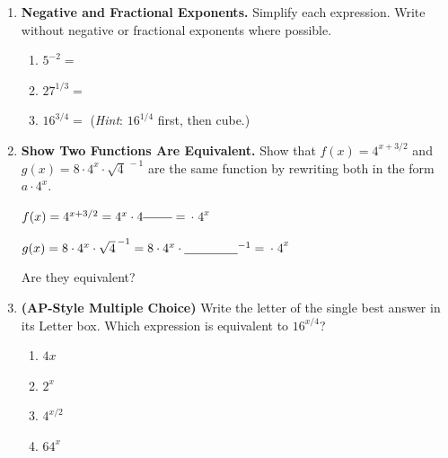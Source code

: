 \documentclass[10pt]{article}
\begin{document}
\begin{enumerate}[itemsep=18pt]
\item \textbf{Negative and Fractional Exponents.}
      Simplify each expression. Write without negative or fractional exponents where possible.

      \begin{enumerate}[label=(\alph*), itemsep=8pt]
        \item $5^{-2} = $ \smash{\gradedblank[id=hw3a, type=short, points=1, answer={\frac{1}{25}}, display={$1/25$}]{3cm}{13pt}}
        \item $27^{1/3} = $ \smash{\gradedblank[id=hw3b, type=short, points=1, answer={3}]{3cm}{13pt}}
        \item $16^{3/4} = $ \smash{\gradedblank[id=hw3c, type=short, points=1, answer={8}]{3cm}{13pt}} \quad (\textit{Hint}: $16^{1/4}$ first, then cube.)
      \end{enumerate}

\item \textbf{Show Two Functions Are Equivalent.}
      Show that $f(x) = 4^{x+3/2}$ and $g(x) = 8 \cdot 4^x \cdot \sqrt{4}^{\,-1}$ are the same
      function by rewriting both in the form $a \cdot 4^x$.

      \vspace{0.08in}
      $f(x) = 4^{x+3/2} = 4^x \cdot 4^{\blank{0.8cm}} = $ \smash{\gradedblank[id=hw4a, type=short, points=2, answer={8}]{3cm}{13pt}} $\cdot\; 4^x$

      \vspace{0.06in}
      $g(x) = 8 \cdot 4^x \cdot \sqrt{4}^{\,-1} = 8 \cdot 4^x \cdot \blank{1.5cm}^{-1} = $ \smash{\gradedblank[id=hw4b, type=short, points=2, answer={4}]{3cm}{13pt}} $\cdot\; 4^x$

      \vspace{0.04in}
      Are they equivalent? \smash{\gradedblank[id=hw4c, type=short, check=text, points=1, answer={no}]{2cm}{13pt}}

\newpage
\item \textbf{(AP-Style Multiple Choice)} Write the letter of the single best answer in its Letter box. Which expression is equivalent to $16^{x/4}$?

      \medskip
      \begin{enumerate}[label=(\Alph*), itemsep=4pt]
        \item $4x$
        \item $2^x$
        \item $4^{x/2}$
        \item $64^x$
      \end{enumerate}


\end{enumerate}
\end{document}
